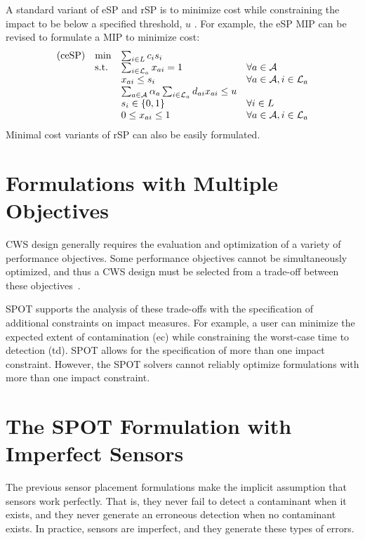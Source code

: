 A standard variant of eSP and rSP is to minimize cost while constraining the impact to be below a specified threshold, $u$ . For example, the eSP MIP can be revised to formulate a MIP to minimize cost: \[ \begin{array}{llll} {\rm (ceSP)} & \min & \sum_{i \in L} c_i s_i & \\ & {\rm s.t.} & \sum_{i\in {\cal L}_a} x_{ai} = 1 &\forall a \in {\cal A}\\ & & x_{ai} \le s_i & \forall a \in {\cal A}, i \in {\cal L}_a\\  & & \sum_{a \in {\cal A}} \alpha_a \sum_{i \in {\cal L}_a} d_{ai} x_{ai} \leq u&\\ & & s_i \in \{0,1\} & \forall i \in L\\ & & 0 \leq x_{ai} \leq 1 & \forall a \in {\cal A}, i \in {\cal L}_a \end{array} \] Minimal cost variants of rSP can also be easily formulated.

\section{Formulations with Multiple Objectives}\label{formulations_formulationsMultiObj}

CWS design generally requires the evaluation and optimization of a variety of performance objectives. Some performance objectives cannot be simultaneously optimized, and thus a CWS design must be selected from a trade-\/off between these   
objectives~\cite{WatGreHar04a}.

SPOT supports the analysis of these trade-\/offs with the specification of additional constraints on impact measures. For example, a user can minimize the expected extent of contamination (ec) while constraining the worst-\/case time to detection (td). SPOT allows for the specification of more than one impact constraint. However, the SPOT solvers cannot reliably optimize formulations with more than one impact constraint.

\section{The SPOT Formulation with Imperfect Sensors}\label{formulations_formulationsImperfect}

The previous sensor placement formulations make the implicit assumption that sensors work perfectly. That is, they never fail to detect a contaminant when it exists, and they never generate an erroneous detection when no contaminant exists. In practice, sensors are imperfect, and they generate these types of errors.

